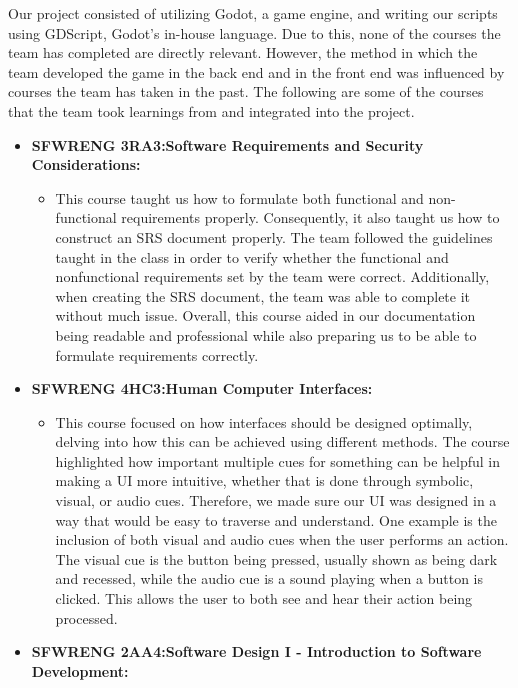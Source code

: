 \documentclass{article}
\begin{document}
Our project consisted of utilizing Godot, a game engine, and writing our scripts using GDScript, Godot's in-house language. Due to this, none of the courses the team has completed are directly relevant. However, the method in which the team developed the game in the back end and in the front end was influenced by courses the team has taken in the past. The following are some of the courses that the team took learnings from and integrated into the project. 

\begin{itemize}
	\item \textbf{SFWRENG 3RA3:Software Requirements and Security Considerations: } 
	\begin{itemize}
		\item This course taught us how to formulate both functional and non-functional requirements properly. Consequently, it also taught us how to construct an SRS document properly. The team followed the guidelines taught in the class in order to verify whether the functional and nonfunctional requirements set by the team were correct. Additionally, when creating the SRS document, the team was able to complete it without much issue. Overall, this course aided in our documentation being readable and professional while also preparing us to be able to formulate requirements correctly.
	\end{itemize}
    \item \textbf{SFWRENG 4HC3:Human Computer Interfaces:} 
    \begin{itemize}
        \item This course focused on how interfaces should be designed optimally, delving into how this can be achieved using different methods. The course highlighted how important multiple cues for something can be helpful in making a UI more intuitive, whether that is done through symbolic, visual, or audio cues. Therefore, we made sure our UI was designed in a way that would be easy to traverse and understand. One example is the inclusion of both visual and audio cues when the user performs an action. The visual cue is the button being pressed, usually shown as being dark and recessed, while the audio cue is a sound playing when a button is clicked. This allows the user to both see and hear their action being processed.   
    \end{itemize}
    \item \textbf{SFWRENG 2AA4:Software Design I - Introduction to Software Development:} 
    \begin{itemize}

\end{itemize}
\end{itemize}
\end{document}
